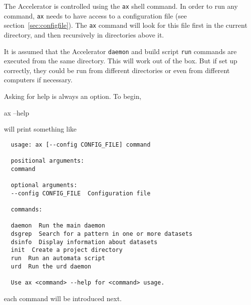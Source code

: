 
\newcommand{\cmd}{\texttt{ax}\xspace}





The Accelerator is controlled using the \cmd shell command.  In order
to run any command, \cmd needs to have access to a configuration file
(see section~\ref{sec:configfile}).  The \cmd command will look for this file first
in the current directory, and then recursively in directories above
it.

It is assumed that the Accelerator \texttt{daemon} and build script
\texttt{run} commands are executed from the same directory.  This will
work out of the box.  But if set up correctly, they could be run from
different directories or even from different computers if necessary.

Asking for help is always an option.  To begin,
\begin{shell}
  ax --help
\end{shell}
will print something like
\begin{snugshade}
\begin{verbatim}
  usage: ax [--config CONFIG_FILE] command

  positional arguments:
  command

  optional arguments:
  --config CONFIG_FILE  Configuration file

  commands:

  daemon  Run the main daemon
  dsgrep  Search for a pattern in one or more datasets
  dsinfo  Display information about datasets
  init  Create a project directory
  run  Run an automata script
  urd  Run the urd daemon

  Use ax <command> --help for <command> usage.
\end{verbatim}
\end{snugshade}
each command will be introduced next.





